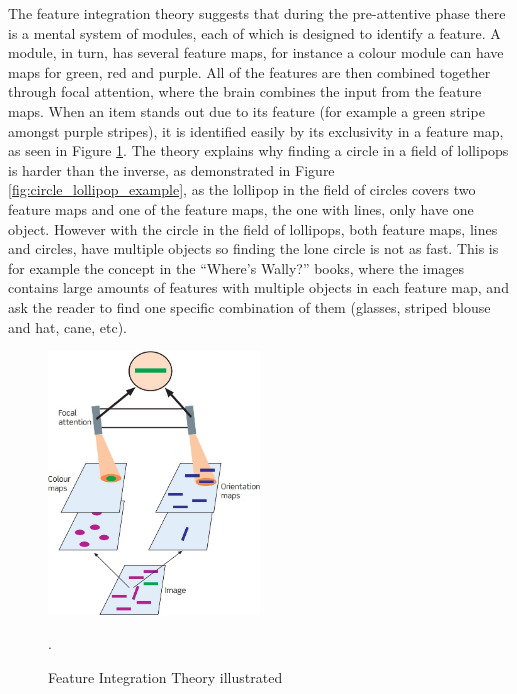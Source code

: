 The feature integration theory suggests that during the pre-attentive phase there is a mental system of modules, each of which is designed to identify a feature. A module, in turn, has several feature maps, for instance a colour module can have maps for green, red and purple. All of the features are then combined together through focal attention, where the brain combines the input from the feature maps. When an item stands out due to its feature (for example a green stripe amongst purple stripes), it is identified easily by its exclusivity in a feature map, as seen in Figure \ref{fig:feature_integration_theory}. The theory explains why finding a circle in a field of lollipops is harder than the inverse, as demonstrated in Figure \ref{fig:circle_lollipop_example}, as the lollipop in the field of circles covers two feature maps and one of the feature maps, the one with lines, only have one object. However with the circle in the field of lollipops, both feature maps, lines and circles, have multiple objects so finding the lone circle is not as fast. This is for example the concept in the “Where’s Wally?” books, where the images contains large amounts of features with multiple objects in each feature map, and ask the reader to find one specific combination of them (glasses, striped blouse and hat, cane, etc)\cite{snowden2012basic}.

\begin{figure}[h!]
	\centering
	\includegraphics[width=0.5\textwidth]{figures/feature_integration_theory.jpg}
	\caption{Feature Integration Theory illustrated \cite{snowden2012basic}}.\label{fig:feature_integration_theory}
\end{figure}

